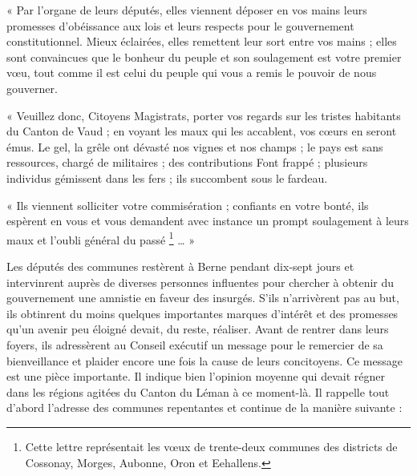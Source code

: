 \documentclass[french,twoside]{book} %
\newenvironment{quoteblock}%
  {\begin{quoting}}
  {\end{quoting}}
\newenvironment{quotebar}{%
    \def\FrameCommand{{\color{rubric!10!}\vrule width 0.5em} \hspace{0.9em}}%
    \def\OuterFrameSep{\itemsep} %
    \MakeFramed {\advance\hsize-\width \FrameRestore}
  }%
  {%
    \endMakeFramed
  }
\renewenvironment{quoteblock}%
  {%
    \savenotes
    \setstretch{0.9}
    \begin{quotebar}
  }
  {%
    \end{quotebar}
    \spewnotes
  }
\begin{document}
\begin{quoteblock}
 \noindent « Par l’organe de leurs députés, elles viennent déposer en vos mains leurs promesses d’obéissance aux lois et leurs respects pour le gouvernement constitutionnel. Mieux éclairées, elles remettent leur sort entre vos mains ; elles sont convaincues que le bonheur du peuple et son soulagement est votre premier vœu, tout comme il est celui du peuple qui vous a remis le pouvoir de nous gouverner.\par
 « Veuillez donc, Citoyens Magistrats, porter vos regards sur les tristes habitants du Canton de Vaud ; en voyant les maux qui les accablent, vos cœurs en seront émus. Le gel, la grêle ont dévasté nos vignes et nos champs ; le pays est sans ressources, chargé de militaires ; des contributions Font frappé ; plusieurs individus gémissent dans les fers ; ils succombent sous le fardeau.\par
 « Ils viennent solliciter votre commisération ; confiants en votre bonté, ils espèrent en vous et vous demandent avec instance un prompt soulagement à leurs maux et l’oubli général du passé \footnote{Cette lettre représentait les vœux de trente-deux communes des districts de Cossonay, Morges, Aubonne, Oron et Eehallens.} … »
 \end{quoteblock}

\noindent Les députés des communes restèrent à Berne pendant dix-sept jours et intervinrent auprès de diverses personnes influentes pour chercher à obtenir du gouvernement une amnistie en faveur des insurgés. S’ils n’arrivèrent pas au but, ils obtinrent du moins quelques importantes marques d’intérêt et des promesses qu’un avenir peu éloigné devait, du reste, réaliser. Avant de rentrer dans leurs foyers, ils adressèrent au Conseil exécutif un message pour le remercier de sa bienveillance et plaider encore une fois la cause de leurs concitoyens. Ce message est une pièce importante. Il indique bien l’opinion moyenne qui devait régner dans les régions agitées du Canton du Léman à ce moment-là. Il rappelle tout d’abord l’adresse des communes repentantes et continue de la manière suivante :\par
\end{document}
